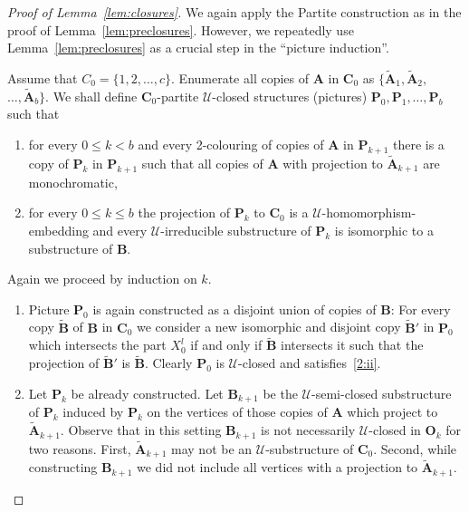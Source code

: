 \documentclass{elsarticle}
\def\str#1{\mathbf {#1}}
\theoremstyle{plain}
\theoremstyle{definition}
\theoremstyle{remark}
\begin{document}
\begin{proof}[Proof of Lemma~\ref{lem:closures}]
We again apply the Partite construction as in the proof of Lemma~\ref{lem:preclosures}.
However, we repeatedly use Lemma~\ref{lem:preclosures} as a crucial step in the ``picture induction''.

Assume that $C_0=\{1,2,\ldots, c\}$.
Enumerate all copies of $\str{A}$ in $\str{C}_0$  as  $\{\widetilde{\str{A}}_1, \widetilde{\str{A}}_2,$ $\ldots, \widetilde{\str{A}}_b\}$.
We shall define $\str{C}_0$-partite $\mathcal U$-closed structures (pictures) $\str{P}_0, \str{P}_1, \ldots, \str{P}_b$ such that
\begin{enumerate}[label=(\roman*)]
\item for every $0\leq k<b$ and every 2-colouring of copies of $\str{A}$ in $\str{P}_{k+1}$ there is a copy of $\str{P}_{k}$ in $\str{P}_{k+1}$ such
that all copies of $\str{A}$ with projection to $\widetilde{\str{A}}_{k+1}$ are monochromatic,
\item\label{2:ii} for every $0\leq k\leq b$ the projection of $\str{P}_k$ to $\str{C}_0$ is a $\mathcal U$-homomorphism-embedding and every $\mathcal U$-irreducible substructure of $\str{P}_k$ is isomorphic to a substructure of $\str{B}$.
\end{enumerate}
Again we proceed by induction on $k$. 

\begin{enumerate}
\item
Picture $\str{P}_0$ is again constructed as a disjoint union of copies of $\str{B}$: For every copy $\widetilde{\str{B}}$ of
$\str{B}$ in $\str{C}_0$ we consider a new isomorphic and disjoint copy $\widetilde{\str{B}}'$ in $\str{P}_0$ which intersects the part $X_0^l$  if and only if $\widetilde{\str{B}}$ intersects it such that the projection of $\widetilde{\str{B}}'$ is $\widetilde{\str{B}}$. Clearly $\str{P}_0$ is $\mathcal U$-closed and satisfies~\ref{2:ii}.

\item

Let $\str{P}_k$ be already constructed.  
Let $\str{B}_{k+1}$ be the $\mathcal U$-semi-closed substructure of  $\str{P}_k$ induced by $\str{P}_k$ on the vertices of those copies of $\str{A}$ which project to $\widetilde{\str{A}}_{k+1}$.
Observe that in this setting $\str{B}_{k+1}$ is not necessarily $\mathcal U$-closed in $\str{O}_k$ for two reasons. First, $\widetilde{\str{A}}_{k+1}$ may not be an $\mathcal U$-substructure of $\str{C}_0$. Second, while constructing $\str{B}_{k+1}$ we did not include all vertices with a projection to $\widetilde{\str{A}}_{k+1}$.


\end{enumerate}
\end{proof}
\end{document}
